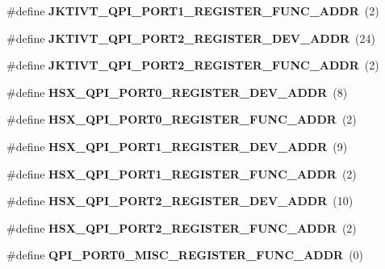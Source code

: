 \begin{DoxyCompactItemize}
\item 
\#define {\bfseries J\+K\+T\+I\+V\+T\+\_\+\+Q\+P\+I\+\_\+\+P\+O\+R\+T1\+\_\+\+R\+E\+G\+I\+S\+T\+E\+R\+\_\+\+F\+U\+N\+C\+\_\+\+A\+D\+D\+R}~(2)\label{types_8h_a2a6e1278034cce4c46e0aa4c004fae91}

\item 
\#define {\bfseries J\+K\+T\+I\+V\+T\+\_\+\+Q\+P\+I\+\_\+\+P\+O\+R\+T2\+\_\+\+R\+E\+G\+I\+S\+T\+E\+R\+\_\+\+D\+E\+V\+\_\+\+A\+D\+D\+R}~(24)\label{types_8h_a492f6579fb2b49601c727370b8706cc4}

\item 
\#define {\bfseries J\+K\+T\+I\+V\+T\+\_\+\+Q\+P\+I\+\_\+\+P\+O\+R\+T2\+\_\+\+R\+E\+G\+I\+S\+T\+E\+R\+\_\+\+F\+U\+N\+C\+\_\+\+A\+D\+D\+R}~(2)\label{types_8h_a41efaa0371b8712857bb66a318bdfd12}

\item 
\#define {\bfseries H\+S\+X\+\_\+\+Q\+P\+I\+\_\+\+P\+O\+R\+T0\+\_\+\+R\+E\+G\+I\+S\+T\+E\+R\+\_\+\+D\+E\+V\+\_\+\+A\+D\+D\+R}~(8)\label{types_8h_a95b6d31ca6901dc2dee96ded36d1d177}

\item 
\#define {\bfseries H\+S\+X\+\_\+\+Q\+P\+I\+\_\+\+P\+O\+R\+T0\+\_\+\+R\+E\+G\+I\+S\+T\+E\+R\+\_\+\+F\+U\+N\+C\+\_\+\+A\+D\+D\+R}~(2)\label{types_8h_ae40ffef6fe93a4028275f69a769c38cb}

\item 
\#define {\bfseries H\+S\+X\+\_\+\+Q\+P\+I\+\_\+\+P\+O\+R\+T1\+\_\+\+R\+E\+G\+I\+S\+T\+E\+R\+\_\+\+D\+E\+V\+\_\+\+A\+D\+D\+R}~(9)\label{types_8h_a64985442a941e4070f0585672d0a3340}

\item 
\#define {\bfseries H\+S\+X\+\_\+\+Q\+P\+I\+\_\+\+P\+O\+R\+T1\+\_\+\+R\+E\+G\+I\+S\+T\+E\+R\+\_\+\+F\+U\+N\+C\+\_\+\+A\+D\+D\+R}~(2)\label{types_8h_a257dd878e1ccdf0c108ad13133d64543}

\item 
\#define {\bfseries H\+S\+X\+\_\+\+Q\+P\+I\+\_\+\+P\+O\+R\+T2\+\_\+\+R\+E\+G\+I\+S\+T\+E\+R\+\_\+\+D\+E\+V\+\_\+\+A\+D\+D\+R}~(10)\label{types_8h_aba140794faf97a7b88354effb66d83e0}

\item 
\#define {\bfseries H\+S\+X\+\_\+\+Q\+P\+I\+\_\+\+P\+O\+R\+T2\+\_\+\+R\+E\+G\+I\+S\+T\+E\+R\+\_\+\+F\+U\+N\+C\+\_\+\+A\+D\+D\+R}~(2)\label{types_8h_a5af4ebca9c3867cda66035a6bcdcb548}

\item 
\#define {\bfseries Q\+P\+I\+\_\+\+P\+O\+R\+T0\+\_\+\+M\+I\+S\+C\+\_\+\+R\+E\+G\+I\+S\+T\+E\+R\+\_\+\+F\+U\+N\+C\+\_\+\+A\+D\+D\+R}~(0)\label{types_8h_a23fe612ba535c6d639bbcecd980ff340}


\end{DoxyCompactItemize}
